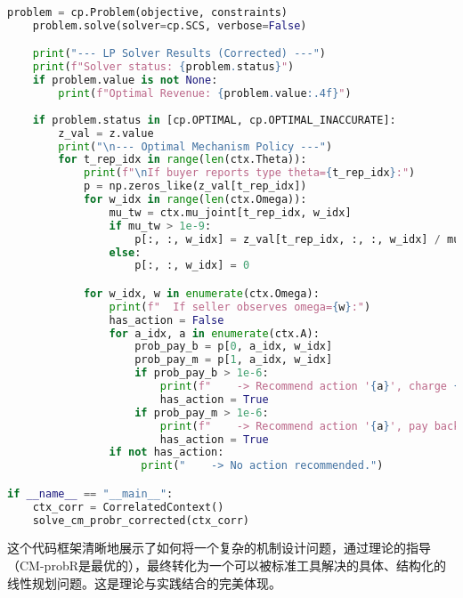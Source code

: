 \begin{lstlisting}[language=Python,style=pythonstyle]
    problem = cp.Problem(objective, constraints)
    problem.solve(solver=cp.SCS, verbose=False)

    print("--- LP Solver Results (Corrected) ---")
    print(f"Solver status: {problem.status}")
    if problem.value is not None:
        print(f"Optimal Revenue: {problem.value:.4f}")
        
    if problem.status in [cp.OPTIMAL, cp.OPTIMAL_INACCURATE]:
        z_val = z.value
        print("\n--- Optimal Mechanism Policy ---")
        for t_rep_idx in range(len(ctx.Theta)):
            print(f"\nIf buyer reports type theta={t_rep_idx}:")
            p = np.zeros_like(z_val[t_rep_idx])
            for w_idx in range(len(ctx.Omega)):
                mu_tw = ctx.mu_joint[t_rep_idx, w_idx]
                if mu_tw > 1e-9:
                    p[:, :, w_idx] = z_val[t_rep_idx, :, :, w_idx] / mu_tw
                else: 
                    p[:, :, w_idx] = 0

            for w_idx, w in enumerate(ctx.Omega):
                print(f"  If seller observes omega={w}:")
                has_action = False
                for a_idx, a in enumerate(ctx.A):
                    prob_pay_b = p[0, a_idx, w_idx]
                    prob_pay_m = p[1, a_idx, w_idx]
                    if prob_pay_b > 1e-6:
                        print(f"    -> Recommend action '{a}', charge {ctx.b} (Prob: {prob_pay_b:.2f})")
                        has_action = True
                    if prob_pay_m > 1e-6:
                        print(f"    -> Recommend action '{a}', pay back {ctx.M} (Prob: {prob_pay_m:.2f})")
                        has_action = True
                if not has_action:
                     print("    -> No action recommended.")

if __name__ == "__main__":
    ctx_corr = CorrelatedContext()
    solve_cm_probr_corrected(ctx_corr)    
\end{lstlisting}

这个代码框架清晰地展示了如何将一个复杂的机制设计问题，通过理论的指导（CM-probR是最优的），最终转化为一个可以被标准工具解决的具体、结构化的线性规划问题。这是理论与实践结合的完美体现。